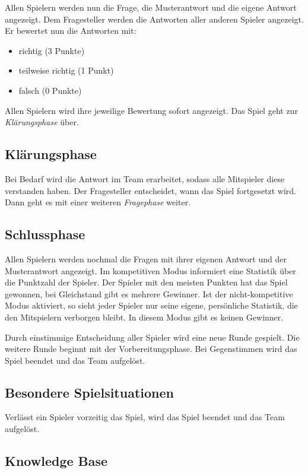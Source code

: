 \documentclass[a4paper,11pt,listof=numbered,glossary=totoc,parskip=half,toc=bib]{scrreprt}
\begin{document}
Allen Spielern werden nun die Frage, die Musterantwort und die eigene Antwort angezeigt. Dem Fragesteller werden die Antworten aller anderen Spieler angezeigt. Er bewertet nun die Antworten mit:

\begin{itemize}
	\item richtig (3 Punkte)
	\item teilweise richtig (1 Punkt)
	\item falsch (0 Punkte)
\end{itemize}

Allen Spielern wird ihre jeweilige Bewertung sofort angezeigt. Das Spiel geht zur \textit{Klärungsphase} über.

\subsection{Klärungsphase}

Bei Bedarf wird die Antwort im Team erarbeitet, sodass alle Mitspieler diese verstanden haben. Der Fragesteller entscheidet, wann das Spiel fortgesetzt wird. Dann geht es mit einer weiteren \textit{Fragephase} weiter.

\subsection{Schlussphase}

Allen Spielern werden nochmal die Fragen mit ihrer eigenen Antwort und der Musterantwort angezeigt.
Im kompetitiven Modus informiert eine Statistik über die Punktzahl der Spieler. Der Spieler mit den meisten Punkten hat das Spiel gewonnen, bei Gleichstand gibt es mehrere Gewinner.
Ist der nicht-kompetitive Modus aktiviert, so sieht jeder Spieler nur seine eigene, persönliche Statistik, die den Mitspielern verborgen bleibt. In diesem Modus gibt es keinen Gewinner.

Durch einstimmige Entscheidung aller Spieler wird eine neue Runde gespielt. Die weitere Runde beginnt mit der Vorbereitungsphase. Bei Gegenstimmen wird das Spiel beendet und das Team aufgelöst.

\subsection{Besondere Spielsituationen}

Verlässt ein Spieler vorzeitig das Spiel, wird das Spiel beendet und das Team aufgelöst.

\subsection{Knowledge Base}
\end{document}
